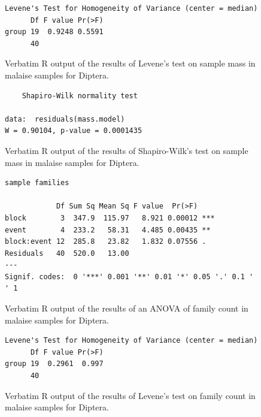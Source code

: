 \documentclass[10pt,letterpaper,twocolumn]{article}
\begin{document}
\begin{figure}[h]
	\lstset{numbers=left}
	\lstset{xleftmargin=5mm,framexleftmargin=5mm}
	\begin{lstlisting}
Levene's Test for Homogeneity of Variance (center = median)
      Df F value Pr(>F)
group 19  0.9248 0.5591
      40               
	\end{lstlisting}
	\caption{Verbatim R output of the results of Levene's test on sample mass in malaise samples for Diptera.}
	\label{fig:malaise_diptera_mass_levene}
	\smallskip
	\nointerlineskip
	\hrulefill
\end{figure}

\begin{figure}[h]
	\lstset{numbers=left}
	\lstset{xleftmargin=5mm,framexleftmargin=5mm}
	\begin{lstlisting}
	Shapiro-Wilk normality test

data:  residuals(mass.model)
W = 0.90104, p-value = 0.0001435
	\end{lstlisting}
	\caption{Verbatim R output of the results of Shapiro-Wilk's test on sample mass in malaise samples for Diptera.}
	\label{fig:malaise_diptera_mass_shapiro}
	\smallskip
	\nointerlineskip
	\hrulefill
\end{figure}

\begin{figure}[h]
	\lstset{numbers=left}
	\lstset{xleftmargin=5mm,framexleftmargin=5mm}
	\begin{lstlisting}
sample families 

            Df Sum Sq Mean Sq F value  Pr(>F)    
block        3  347.9  115.97   8.921 0.00012 ***
event        4  233.2   58.31   4.485 0.00435 ** 
block:event 12  285.8   23.82   1.832 0.07556 .  
Residuals   40  520.0   13.00                    
---
Signif. codes:  0 '***' 0.001 '**' 0.01 '*' 0.05 '.' 0.1 ' ' 1
	\end{lstlisting}
	\caption{Verbatim R output of the results of an ANOVA of family count in malaise samples for Diptera.}
	\label{fig:malaise_diptera_family_anova}
	\smallskip
	\nointerlineskip
	\hrulefill
\end{figure}

\begin{figure}[h]
	\lstset{numbers=left}
	\lstset{xleftmargin=5mm,framexleftmargin=5mm}
	\begin{lstlisting}
Levene's Test for Homogeneity of Variance (center = median)
      Df F value Pr(>F)
group 19  0.2961  0.997
      40               
	\end{lstlisting}
	\caption{Verbatim R output of the results of Levene's test on family count in malaise samples for Diptera.}
	\label{fig:malaise_diptera_family_levene}
	\smallskip
	\nointerlineskip
	\hrulefill
\end{figure}
\end{document}

